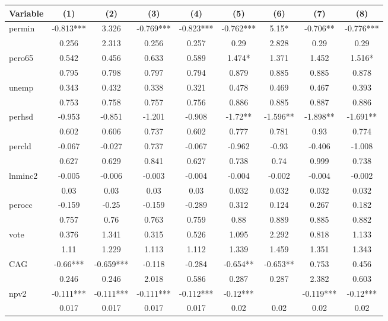 \documentclass[12pt]{article}
\begin{document}
{\begin{table}[H]
{    \begin{tabular}{l|cccc|cccc}
    \hline
        Variable & (1) & (2) & (3) & (4) & (5) & (6) & (7) & (8) \\ \hline
        permin & -0.813*** & 3.326 & -0.769*** & -0.823*** & -0.762*** & 5.15* & -0.706** & -0.776*** \\ 
        ~ & 0.256 & 2.313 & 0.256 & 0.257 & 0.29 & 2.828 & 0.29 & 0.29 \\ 
        pero65 & 0.542 & 0.456 & 0.633 & 0.589 & 1.474* & 1.371 & 1.452 & 1.516* \\ 
        ~ & 0.795 & 0.798 & 0.797 & 0.794 & 0.879 & 0.885 & 0.885 & 0.878 \\ 
        unemp & 0.343 & 0.432 & 0.338 & 0.321 & 0.478 & 0.469 & 0.467 & 0.393 \\ 
        ~ & 0.753 & 0.758 & 0.757 & 0.756 & 0.886 & 0.885 & 0.887 & 0.886 \\ 
        perhsd & -0.953 & -0.851 & -1.201 & -0.908 & -1.72** & -1.596** & -1.898** & -1.691** \\ 
        ~ & 0.602 & 0.606 & 0.737 & 0.602 & 0.777 & 0.781 & 0.93 & 0.774 \\ 
        percld & -0.067 & -0.027 & 0.737 & -0.067 & -0.962 & -0.93 & -0.406 & -1.008 \\ 
        ~ & 0.627 & 0.629 & 0.841 & 0.627 & 0.738 & 0.74 & 0.999 & 0.738 \\ 
        lnminc2 & -0.005 & -0.006 & -0.003 & -0.004 & -0.004 & -0.002 & -0.004 & -0.002 \\ 
        ~ & 0.03 & 0.03 & 0.03 & 0.03 & 0.032 & 0.032 & 0.032 & 0.032 \\ 
        perocc & -0.159 & -0.25 & -0.159 & -0.289 & 0.312 & 0.124 & 0.267 & 0.182 \\ 
        ~ & 0.757 & 0.76 & 0.763 & 0.759 & 0.88 & 0.889 & 0.885 & 0.882 \\ \hline
        vote & 0.376 & 1.341 & 0.315 & 0.526 & 1.095 & 2.292 & 0.818 & 1.133 \\ 
        ~ & 1.11 & 1.229 & 1.113 & 1.112 & 1.339 & 1.459 & 1.351 & 1.343 \\ 
        CAG & -0.66*** & -0.659*** & -0.118 & -0.284 & -0.654** & -0.653** & 0.753 & 0.456 \\ 
        ~ & 0.246 & 0.246 & 2.018 & 0.586 & 0.287 & 0.287 & 2.382 & 0.603 \\ 
        npv2 & -0.111*** & -0.111*** & -0.111*** & -0.112*** & -0.12*** & ~ & -0.119*** & -0.12*** \\ 
        ~ & 0.017 & 0.017 & 0.017 & 0.017 & 0.02 & 0.02 & 0.02 & 0.02 \\ 

\end{tabular}}
\end{table}}
\end{document}
